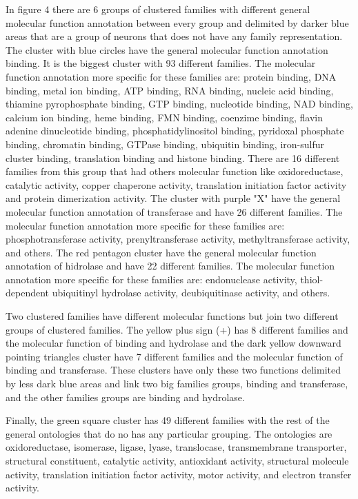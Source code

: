 \documentclass[preprint,12pt]{elsarticle}
\begin{document}
In figure 4 there are 6 groups of clustered families with different 
general molecular function annotation between every group and 
delimited by darker blue areas that are a group of neurons that 
does not have any family representation. 
The cluster with blue circles have the general molecular function 
annotation binding. It is the biggest cluster with 93 different 
families. The molecular function annotation more specific for 
these families are: protein binding, DNA binding, metal ion binding, 
ATP binding, RNA binding, nucleic acid binding, thiamine pyrophosphate 
binding, GTP binding, nucleotide binding, NAD binding, calcium ion 
binding, heme binding, FMN binding, coenzime binding, flavin adenine 
dinucleotide binding, phosphatidylinositol binding, pyridoxal phosphate 
binding, chromatin binding, GTPase binding, ubiquitin binding, iron-sulfur 
cluster binding, translation binding and histone binding. There are 16 
different families from this group that had others molecular function like 
oxidoreductase, catalytic activity, copper chaperone activity, translation 
initiation factor activity and protein dimerization activity. The cluster 
with purple "X" have the general molecular function annotation of 
transferase and have 26 different families. The molecular function 
annotation more specific for these families are: phosphotransferase 
activity, prenyltransferase activity, methyltransferase activity, and 
others. The red pentagon cluster have the general molecular function 
annotation of hidrolase and have 22 different families. The molecular 
function annotation more specific for these families are: endonuclease 
activity, thiol-dependent ubiquitinyl hydrolase activity, deubiquitinase 
activity, and others. \par 

Two clustered families have different molecular functions but join 
two different groups of clustered families. The yellow plus sign (+) 
has 8 different families and the molecular function of binding and 
hydrolase and the dark yellow downward pointing triangles cluster 
have 7 different families and the molecular function of binding and 
transferase. These clusters have only these two functions delimited 
by less dark blue areas and link two big families groups, binding 
and transferase, and the other families groups are binding and 
hydrolase. \par 

Finally, the green square cluster has 49 different families with 
the rest of the general ontologies that do no has any particular 
grouping. The ontologies are oxidoreductase, isomerase, ligase, 
lyase, translocase, transmembrane transporter, structural constituent, 
catalytic activity, antioxidant activity, structural molecule 
activity, translation initiation factor activity, motor activity, 
and electron transfer activity. \par 
\end{document}
